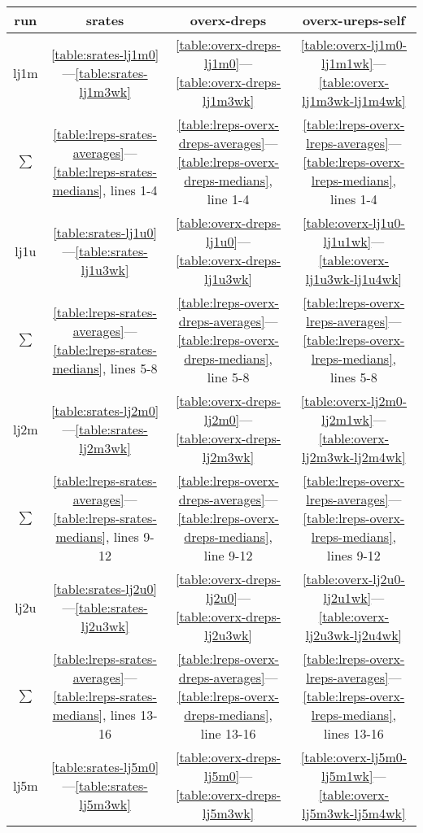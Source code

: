 \documentclass[10pt,oneside]{memoir}
\begin{document}
\begin{table}
\begin{tabular}{|cccc|}
\toprule
run & srates & overx-dreps & overx-ureps-self  \\
\midrule
lj1m & \ref{table:srates-lj1m0}—\ref{table:srates-lj1m3wk} & \ref{table:overx-dreps-lj1m0}—\ref{table:overx-dreps-lj1m3wk} & \ref{table:overx-lj1m0-lj1m1wk}—\ref{table:overx-lj1m3wk-lj1m4wk} \\
$\sum$ & \ref{table:lreps-srates-averages}—\ref{table:lreps-srates-medians}, lines 1-4 & \ref{table:lreps-overx-dreps-averages}—\ref{table:lreps-overx-dreps-medians}, line 1-4 & \ref{table:lreps-overx-lreps-averages}—\ref{table:lreps-overx-lreps-medians}, lines 1-4  \\
\hline
lj1u & \ref{table:srates-lj1u0}—\ref{table:srates-lj1u3wk} & \ref{table:overx-dreps-lj1u0}—\ref{table:overx-dreps-lj1u3wk} & \ref{table:overx-lj1u0-lj1u1wk}—\ref{table:overx-lj1u3wk-lj1u4wk} \\
$\sum$ & \ref{table:lreps-srates-averages}—\ref{table:lreps-srates-medians}, lines 5-8 & \ref{table:lreps-overx-dreps-averages}—\ref{table:lreps-overx-dreps-medians}, line 5-8 & \ref{table:lreps-overx-lreps-averages}—\ref{table:lreps-overx-lreps-medians}, lines 5-8  \\
\hline
lj2m & \ref{table:srates-lj2m0}—\ref{table:srates-lj2m3wk} & \ref{table:overx-dreps-lj2m0}—\ref{table:overx-dreps-lj2m3wk} & \ref{table:overx-lj2m0-lj2m1wk}—\ref{table:overx-lj2m3wk-lj2m4wk} \\
$\sum$ & \ref{table:lreps-srates-averages}—\ref{table:lreps-srates-medians}, lines 9-12 & \ref{table:lreps-overx-dreps-averages}—\ref{table:lreps-overx-dreps-medians}, line 9-12 & \ref{table:lreps-overx-lreps-averages}—\ref{table:lreps-overx-lreps-medians}, lines 9-12  \\
\hline
lj2u & \ref{table:srates-lj2u0}—\ref{table:srates-lj2u3wk} & \ref{table:overx-dreps-lj2u0}—\ref{table:overx-dreps-lj2u3wk} & \ref{table:overx-lj2u0-lj2u1wk}—\ref{table:overx-lj2u3wk-lj2u4wk} \\
$\sum$ & \ref{table:lreps-srates-averages}—\ref{table:lreps-srates-medians}, lines 13-16 & \ref{table:lreps-overx-dreps-averages}—\ref{table:lreps-overx-dreps-medians}, line 13-16 & \ref{table:lreps-overx-lreps-averages}—\ref{table:lreps-overx-lreps-medians}, lines 13-16  \\
\hline
lj5m & \ref{table:srates-lj5m0}—\ref{table:srates-lj5m3wk} & \ref{table:overx-dreps-lj5m0}—\ref{table:overx-dreps-lj5m3wk} & \ref{table:overx-lj5m0-lj5m1wk}—\ref{table:overx-lj5m3wk-lj5m4wk} \\

\end{tabular}
\end{table}
\end{document}
